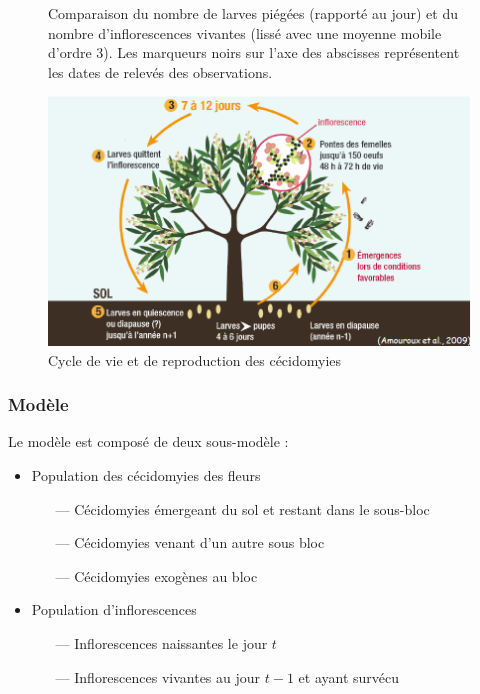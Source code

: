 \documentclass[11pt, a4paper]{beamer}
\newcommand{\1}{\mbox{\textbf{1}}}
\begin{document}
\begin{frame}
 \begin{figure}
 \centering
 \caption{Comparaison du nombre de larves piégées (rapporté au jour) et du nombre d'inflorescences vivantes (lissé avec une moyenne mobile d'ordre 3). Les marqueurs noirs sur l'axe des abscisses représentent les dates de relevés des observations.}
\end{figure}
\end{frame}


\begin{frame}
 \begin{figure}
   \includegraphics[scale=0.4]{cycle.png}
\caption{Cycle de vie et de reproduction des cécidomyies}
 \end{figure} 
\end{frame}


\begin{frame}
 \frametitle{Modèle}
 Le modèle est composé de deux sous-modèle :
 
 \begin{itemize}
  \item Population des cécidomyies des fleurs
  \begin{itemize}
   \item[---] Cécidomyies émergeant du sol et restant dans le sous-bloc
   \item[---] Cécidomyies venant d'un autre sous bloc
   \item[---] Cécidomyies exogènes au bloc
  \end{itemize}

  \item Population d'inflorescences
  \begin{itemize}
   \item[---] Inflorescences naissantes le jour $t$
   \item[---] Inflorescences vivantes au jour $t-1$ et ayant survécu
  \end{itemize}

 \end{itemize}

\end{frame}
\end{document}
